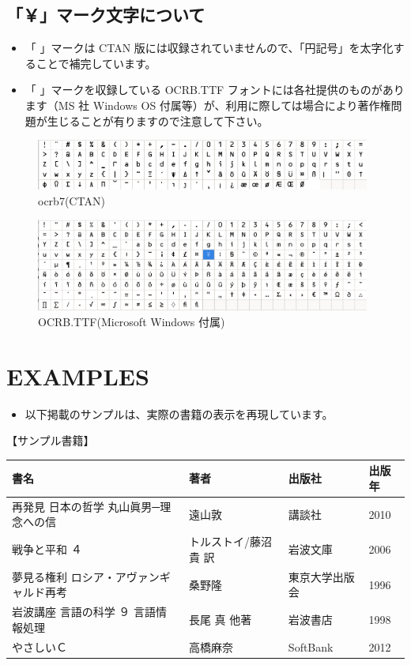 \documentclass[a5j,tombo,10pt,titlepage,pdfusetitle]{ltjsbook}
\def\fs#1#2{\fontsize{#1}{#2}\selectfont }
\begin{document}
{\newpage
\thispagestyle{empty}


\subsection{「￥」マーク文字について}\vspace{-2mm}
{\fs{9}{9}\begin{itemize}
  \item 「 」マークは CTAN 版には収録されていませんので、「円記号」を太字化することで補完しています。
  \item 「 」マークを収録している OCRB.TTF フォントには各社提供のものがあります（MS 社 Windows OS 付属等）が、利用に際しては場合により著作権問題が生じることが有りますので注意して下さい。

\end{itemize}
}

\begin{figure}[H]
\centering
\includegraphics[width=11cm]{./images/ocrb-ttf01.png}
\caption{ocrb7(CTAN)} 
\end{figure}
\begin{figure}[H]
\centering
\includegraphics[width=11cm]{./images/ocrb-ttf-ms2.png}
\caption{OCRB.TTF(Microsoft Windows 付属)} 
\end{figure}

\newpage

\section{EXAMPLES}   
\begin{itemize}
  \item 以下掲載のサンプルは、実際の書籍の表示を再現しています。
\end{itemize}

【サンプル書籍】
\begin{table}[H]\fs{8}{8}
\begin{tabular}{llll}
書名 & 著者 & 出版社 & 出版年\\ 
\hline
再発見 日本の哲学 丸山眞男─理念への信 & 遠山敦 & 講談社 & 2010\\ 
戦争と平和 ４ & トルストイ/藤沼 貴 訳 & 岩波文庫 & 2006\\ 
夢見る権利 ロシア・アヴァンギャルド再考 & 桑野隆 & 東京大学出版会 & 1996\\ 
岩波講座 言語の科学 ９ 言語情報処理 & 長尾 真 他著 & 岩波書店 & 1998\\ 
やさしいＣ & 高橋麻奈 & SoftBank & 2012\\ 
\end{tabular}
\end{table}

}
\end{document}
